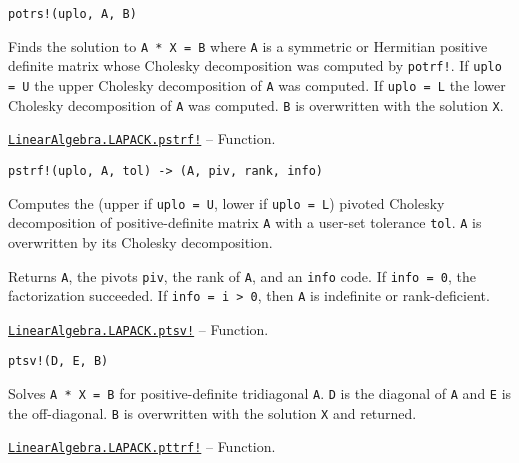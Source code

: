 \begin{adjustwidth}{2em}{0pt}


\begin{verbatim}
potrs!(uplo, A, B)
\end{verbatim}

Finds the solution to \texttt{A * X = B} where \texttt{A} is a symmetric or Hermitian positive definite matrix whose Cholesky decomposition was computed by \texttt{potrf!}. If \texttt{uplo = U} the upper Cholesky decomposition of \texttt{A} was computed. If \texttt{uplo = L} the lower Cholesky decomposition of \texttt{A} was computed. \texttt{B} is overwritten with the solution \texttt{X}.



\end{adjustwidth}
\hypertarget{15908768904043509489}{}
\hyperlink{15908768904043509489}{\texttt{LinearAlgebra.LAPACK.pstrf!}}  -- {Function.}

\begin{adjustwidth}{2em}{0pt}


\begin{verbatim}
pstrf!(uplo, A, tol) -> (A, piv, rank, info)
\end{verbatim}

Computes the (upper if \texttt{uplo = U}, lower if \texttt{uplo = L}) pivoted Cholesky decomposition of positive-definite matrix \texttt{A} with a user-set tolerance \texttt{tol}. \texttt{A} is overwritten by its Cholesky decomposition.

Returns \texttt{A}, the pivots \texttt{piv}, the rank of \texttt{A}, and an \texttt{info} code. If \texttt{info = 0}, the factorization succeeded. If \texttt{info = i > 0}, then \texttt{A} is indefinite or rank-deficient.



\end{adjustwidth}
\hypertarget{10214325419469953635}{}
\hyperlink{10214325419469953635}{\texttt{LinearAlgebra.LAPACK.ptsv!}}  -- {Function.}

\begin{adjustwidth}{2em}{0pt}


\begin{verbatim}
ptsv!(D, E, B)
\end{verbatim}

Solves \texttt{A * X = B} for positive-definite tridiagonal \texttt{A}. \texttt{D} is the diagonal of \texttt{A} and \texttt{E} is the off-diagonal. \texttt{B} is overwritten with the solution \texttt{X} and returned.



\end{adjustwidth}
\hypertarget{9537322497705664212}{}
\hyperlink{9537322497705664212}{\texttt{LinearAlgebra.LAPACK.pttrf!}}  -- {Function.}

